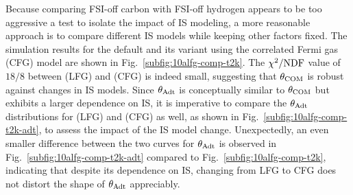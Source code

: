      Because comparing FSI-off carbon with FSI-off hydrogen appears to be too aggressive a test to isolate the impact of IS modeling, a more reasonable approach is to compare different IS models while keeping other factors fixed.
     The simulation results for the default \geta and its variant using the correlated Fermi gas (CFG) model are shown in Fig.~\ref{subfig:10alfg-comp-t2k}.
     The $\chi^2/{\textrm{NDF}}$ value of $18/8$ between \geta (LFG) and \geta (CFG) is indeed small, suggesting that $\theta_{\textrm{COM}}$ is robust against changes in IS models.
     Since $\theta_{\textrm{Adt}}$ is conceptually similar to $\theta_{\textrm{COM}}$ but exhibits a larger dependence on IS, it is imperative to compare the $\theta_{\textrm{Adt}}$ distributions for \geta (LFG) and \geta (CFG) as well, as shown in Fig.~\ref{subfig:10alfg-comp-t2k-adt}, to assess the impact of the IS model change.
     Unexpectedly, an even smaller difference between the two curves for $\theta_{\textrm{Adt}}$ is observed in Fig.~\ref{subfig:10alfg-comp-t2k-adt} compared to Fig.~\ref{subfig:10alfg-comp-t2k}, indicating that despite its dependence on IS, changing from LFG to CFG does not distort the shape of $\theta_{\textrm{Adt}}$ appreciably.
